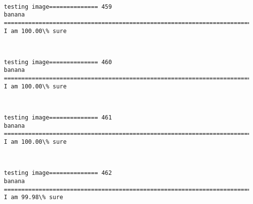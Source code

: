 \documentclass[11pt]{article}
\begin{document}
    \begin{center}
    \end{center}
    { \hspace*{\fill} \\}
    
    \begin{Verbatim}[commandchars=\\\{\}]
testing image============== 459
banana
============================================================================
I am 100.00\% sure

    \end{Verbatim}

    \begin{center}
    \end{center}
    { \hspace*{\fill} \\}
    
    \begin{Verbatim}[commandchars=\\\{\}]
testing image============== 460
banana
============================================================================
I am 100.00\% sure

    \end{Verbatim}

    \begin{center}
    \end{center}
    { \hspace*{\fill} \\}
    
    \begin{Verbatim}[commandchars=\\\{\}]
testing image============== 461
banana
============================================================================
I am 100.00\% sure

    \end{Verbatim}

    \begin{center}
    \end{center}
    { \hspace*{\fill} \\}
    
    \begin{Verbatim}[commandchars=\\\{\}]
testing image============== 462
banana
============================================================================
I am 99.98\% sure

    \end{Verbatim}
\end{document}
